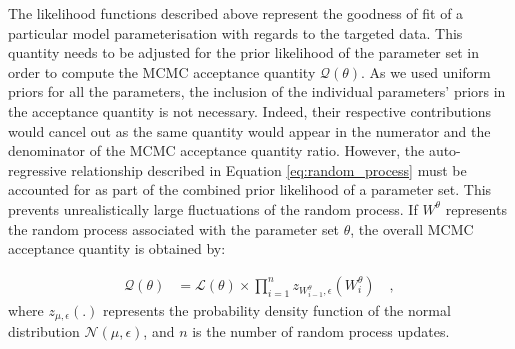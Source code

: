 The likelihood functions described above represent the goodness of fit of a particular model parameterisation with regards to the targeted data. 
This quantity needs to be adjusted for the prior likelihood of the parameter set in order to compute the MCMC acceptance quantity $\mathcal{Q}(\theta)$.
As we used uniform priors for all the parameters, the inclusion of the individual parameters' priors in the acceptance quantity is not necessary. 
Indeed, their respective contributions would cancel out as the same quantity would appear in the numerator and the denominator of the 
MCMC acceptance quantity ratio. However, the auto-regressive relationship described in Equation \ref{eq:random_process}
must be accounted for as part of the combined prior likelihood of a parameter set. This prevents unrealistically large fluctuations of the random process.
If $W^\theta$ represents the random process associated with the parameter set $\theta$, the overall MCMC acceptance quantity is obtained by:

\begin{equation}
    \label{eq:acc_qtt}
    \begin{split}
    \mathcal{Q}(\theta) & = \mathcal{L}(\theta) \times \prod_{i=1}^{n} z_{W^\theta_{i-1},\epsilon}(W^\theta_i) \quad ,
    \end{split}
\end{equation}
where $z_{\mu,\epsilon}(.)$ represents the probability density function of the normal distribution $\mathcal{N}(\mu, \epsilon)$, and $n$ is the number 
of random process updates.


